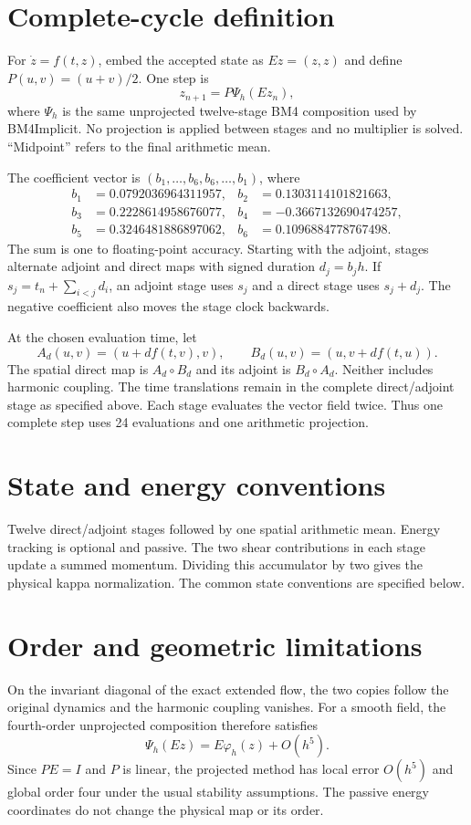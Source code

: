 \documentclass[11pt,a4paper]{article}
\begin{document}
\section{Complete-cycle definition}
For $\dot z=f(t,z)$, embed the accepted state as $E z=(z,z)$ and define
$P(u,v)=(u+v)/2$. One step is
\[
 z_{n+1}=P\Psi_h(Ez_n),
\]
where $\Psi_h$ is the same unprojected twelve-stage BM4 composition used by
BM4Implicit. No projection is applied between stages and no multiplier is
solved. ``Midpoint'' refers to the final arithmetic mean.

The coefficient vector is $(b_1,\ldots,b_6,b_6,\ldots,b_1)$, where
\begin{align*}
b_1&=0.0792036964311957,& b_2&=0.1303114101821663,\\
b_3&=0.2228614958676077,& b_4&=-0.3667132690474257,\\
b_5&=0.3246481886897062,& b_6&=0.1096884778767498.
\end{align*}
The sum is one to floating-point accuracy. Starting with the adjoint, stages
alternate adjoint and direct maps with signed duration $d_j=b_jh$.
If $s_j=t_n+\sum_{i<j}d_i$, an adjoint stage uses $s_j$ and a direct stage uses
$s_j+d_j$. The negative coefficient also moves the stage clock backwards.

At the chosen evaluation time, let
\[
A_d(u,v)=(u+d f(t,v),v),\qquad
B_d(u,v)=(u,v+d f(t,u)).
\]
The spatial direct map is $A_d\circ B_d$ and its adjoint is
$B_d\circ A_d$. Neither includes harmonic coupling. The time translations
remain in the complete direct/adjoint stage as specified above.
Each stage evaluates the vector field twice.
Thus one complete step uses 24 evaluations and one arithmetic projection.

\section{State and energy conventions}
Twelve direct/adjoint stages followed by one spatial arithmetic mean. Energy tracking is optional and passive.
The two shear contributions in each stage update a summed momentum. Dividing this accumulator by two gives the physical kappa normalization.
The common state conventions are specified below.

\section{Order and geometric limitations}
On the invariant diagonal of the exact extended flow, the two copies follow
the original dynamics and the harmonic coupling vanishes. For a smooth field,
the fourth-order unprojected composition therefore satisfies
\[
 \Psi_h(Ez)=E\varphi_h(z)+O(h^5).
\]
Since $P E=I$ and $P$ is linear, the projected method has local error
$O(h^5)$ and global order four under the usual stability assumptions.
The passive energy coordinates do not change the physical map or its order.
\end{document}
